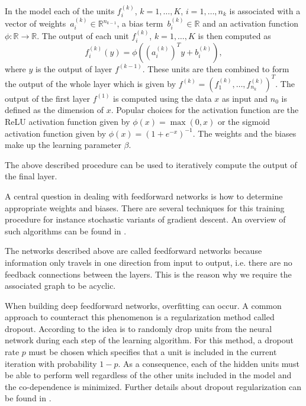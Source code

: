 \documentclass[12pt, a4paper]{scrartcl}
\theoremstyle{definition}
\theoremstyle{plain}
\numberwithin{equation}{section}
\numberwithin{figure}{section}
\numberwithin{table}{section}
\begin{document}
	In the model each of the units $f^{(k)}_i$, $k=1,\dots,K$, $i = 1,\dots,n_{k}$ is associated with a vector of weights~$a^{(k)}_i \in \mathbb{R}^{n_{k-1}}$, a bias term~$b^{(k)}_i\in \mathbb{R}$ and an activation function~$\phi: \mathbb{R} \to \mathbb{R}$.
	The output of each unit $f^{(k)}_i$, $k=1,\dots,K$ is then computed as
	\begin{equation*}
	f_i^{(k)}(y) = \phi \left(\left(a^{(k)}_i\right)^Ty + b^{(k)}_i\right),
	\end{equation*}
	where $y$ is the output of layer $f^{(k-1)}$.
	These units are then combined to form the output of the whole layer which is given by $f^{(k)} = \left(f^{(k)}_1,\dots, f^{(k)}_{n_k}\right)^T$.
	The output of the first layer $f^{(1)}$ is computed using the data $x$ as input and $n_0$ is defined as the dimension of $x$.
	Popular choices for the activation function are the ReLU activation function given by $\phi(x) = \max(0,x)$ or the sigmoid activation function given by $\phi(x) = (1+e^{-x})^{-1}$.
	The weights and the biases make up the learning parameter $\beta$.
	
	The above described procedure can be used to iteratively compute the output of the final layer.
	
	A central question in dealing with feedforward networks is how to determine appropriate weights and biases.
	There are several techniques for this training procedure for instance stochastic variants of gradient descent.
	An overview of such algorithms can be found in \citet*[Chapter~5]{deeplbook}.
	
	The networks described above are called feedforward networks because information only travels in one direction from input to output, i.e. there are no feedback connections between the layers.
	This is the reason why we require the associated graph to be acyclic.
	
	When building deep feedforward networks, overfitting can occur.
	A common approach to counteract this phenomenon is a regularization method called dropout.
	According to \citet*{dropout} the idea is to randomly drop units from the neural network during each step of the learning algorithm.
	For this method, a dropout rate $p$ must be chosen which specifies that a unit is included in the current iteration with probability $1-p$.
	As a consequence, each of the hidden units must be able to perform well regardless of the other units included in the model and the co-dependence is minimized.
	Further details about dropout regularization can be found in \citet*{dropout}.
	
\end{document}
